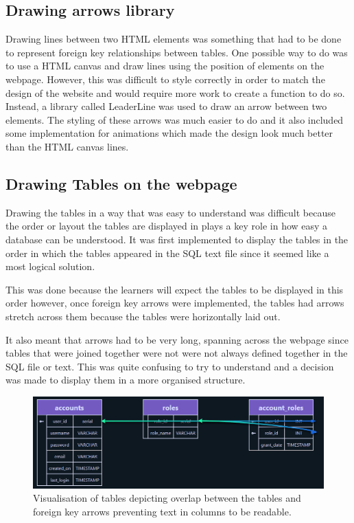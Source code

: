 \subsection{Drawing arrows library}

Drawing lines between two HTML elements was something that had to be done to represent foreign key relationships between tables. One possible way to do was to use a HTML canvas and draw lines using the position of elements on the webpage. However, this was difficult to style correctly in order to match the design of the website and would require more work to create a function to do so. Instead, a library called LeaderLine \cite{leaderLine} was used to draw an arrow between two elements. The styling of these arrows was much easier to do and it also included some implementation for animations which made the design look much better than the HTML canvas lines.

\subsection{Drawing Tables on the webpage}

Drawing the tables in a way that was easy to understand was difficult because the order or layout the tables are displayed in plays a key role in how easy a database can be understood. It was first implemented to display the tables in the order in which the tables appeared in the SQL text file since it seemed like a most logical solution. 

This was done because the learners will expect the tables to be displayed in this order however, once foreign key arrows were implemented, the tables had arrows stretch across them because the tables were horizontally laid out. 

It also meant that arrows had to be very long, spanning across the webpage since tables that were joined together were not were not always defined together in the SQL file or text. This was quite confusing to try to understand and a decision was made to display them in a more organised structure. 

\begin{figure}[h!]
	\centering
	\includegraphics[width=\textwidth]{overlap}
	\caption{Visualisation of tables depicting overlap between the tables and foreign key arrows preventing text in columns to be readable.}
	\label{fig:overlap}
\end{figure}

